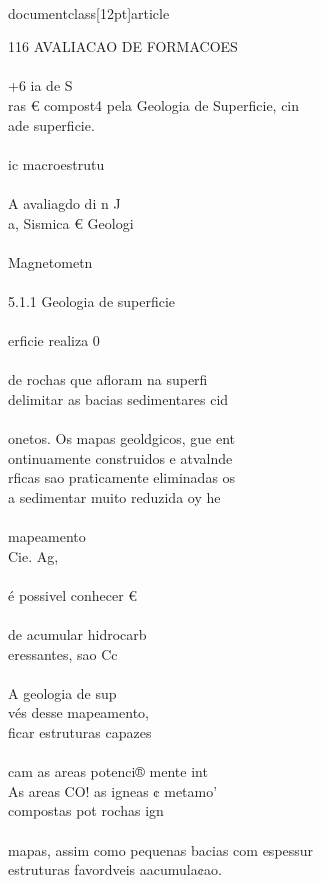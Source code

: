 \\documentclass[12pt]{article}
\begin{document}
116 AVALIACAO DE FORMACOES\\
\\
+6 ia de S\\
ras € compost4 pela Geologia de Superficie, cin\\
ade superficie.\\
\\
ic macroestrutu\\
\\
A avaliagdo di n J\\
a, Sismica € Geologi\\
\\
Magnetometn\\
\\
5.1.1 Geologia de superficie\\
\\
erficie realiza 0\\
\\
de rochas que afloram na superfi\\
delimitar as bacias sedimentares cid\\
\\
onetos. Os mapas geoldgicos, gue ent\\
ontinuamente construidos e atvalnde\\
rficas sao praticamente eliminadas os\\
a sedimentar muito reduzida oy he\\
\\
mapeamento\\
Cie. Ag,\\
\\
é possivel conhecer €\\
\\
de acumular hidrocarb\\
eressantes, sao Cc\\
\\
A geologia de sup\\
vés desse mapeamento,\\
ficar estruturas capazes\\
\\
cam as areas potenci® mente int\\
As areas CO! as igneas ¢ metamo’\\
compostas pot rochas ign\\
\\
mapas, assim como pequenas bacias com espessur\\
estruturas favordveis aacumula¢ao.\\
\\
\end{document}
